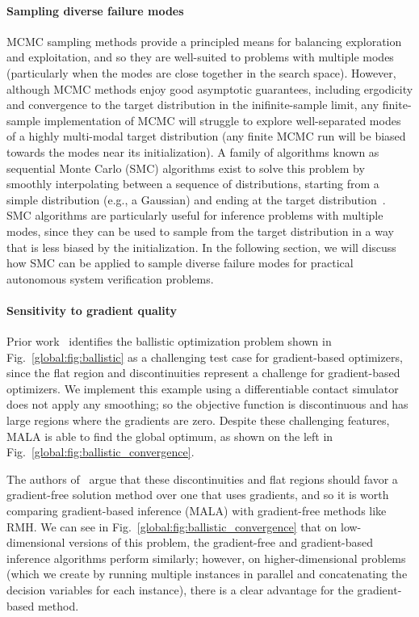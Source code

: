 \paragraph{Sampling diverse failure modes} MCMC sampling methods provide a principled means for balancing exploration and exploitation, and so they are well-suited to problems with multiple modes (particularly when the modes are close together in the search space). However, although MCMC methods enjoy good asymptotic guarantees, including ergodicity and convergence to the target distribution in the inifinite-sample limit, any finite-sample implementation of MCMC will struggle to explore well-separated modes of a highly multi-modal target distribution (any finite MCMC run will be biased towards the modes near its initialization). A family of algorithms known as sequential Monte Carlo (SMC) algorithms exist to solve this problem by smoothly interpolating between a sequence of distributions, starting from a simple distribution (e.g., a Gaussian) and ending at the target distribution~\cite{chopinIntroductionSequentialMonte2020}. SMC algorithms are particularly useful for inference problems with multiple modes, since they can be used to sample from the target distribution in a way that is less biased by the initialization. In the following section, we will discuss how SMC can be applied to sample diverse failure modes for practical autonomous system verification problems.

\paragraph{Sensitivity to gradient quality} Prior work~\cite{suhDifferentiableSimulatorsGive2022} identifies the ballistic optimization problem shown in Fig.~\ref{global:fig:ballistic} as a challenging test case for gradient-based optimizers, since the flat region and discontinuities represent a challenge for gradient-based optimizers. We implement this example using a differentiable contact simulator does not apply any smoothing; so the objective function is discontinuous and has large regions where the gradients are zero. Despite these challenging features, MALA is able to find the global optimum, as shown on the left in Fig.~\ref{global:fig:ballistic_convergence}.

The authors of~\cite{suhDifferentiableSimulatorsGive2022} argue that these discontinuities and flat regions should favor a gradient-free solution method over one that uses gradients, and so it is worth comparing gradient-based inference (MALA) with gradient-free methods like RMH. We can see in Fig.~\ref{global:fig:ballistic_convergence} that on low-dimensional versions of this problem, the gradient-free and gradient-based inference algorithms perform similarly; however, on higher-dimensional problems (which we create by running multiple instances in parallel and concatenating the decision variables for each instance), there is a clear advantage for the gradient-based method.

